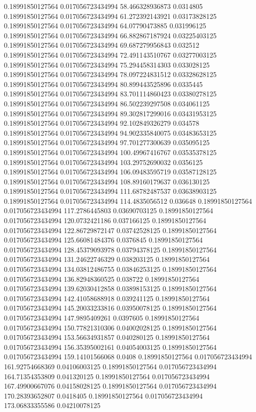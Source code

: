 0.18991850127564 0.017056723434994 58.466328936873 0.0314805
0.18991850127564 0.017056723434994 61.272392143921 0.03173828125
0.18991850127564 0.017056723434994 64.07790473885 0.031996125
0.18991850127564 0.017056723434994 66.882867187924 0.03225403125
0.18991850127564 0.017056723434994 69.687279956843 0.032512
0.18991850127564 0.017056723434994 72.491143510767 0.03277003125
0.18991850127564 0.017056723434994 75.294458314303 0.033028125
0.18991850127564 0.017056723434994 78.097224831512 0.03328628125
0.18991850127564 0.017056723434994 80.899443525896 0.0335445
0.18991850127564 0.017056723434994 83.701114860423 0.03380278125
0.18991850127564 0.017056723434994 86.502239297508 0.034061125
0.18991850127564 0.017056723434994 89.302817299016 0.03431953125
0.18991850127564 0.017056723434994 92.102849326279 0.034578
0.18991850127564 0.017056723434994 94.902335840075 0.03483653125
0.18991850127564 0.017056723434994 97.701277300639 0.035095125
0.18991850127564 0.017056723434994 100.49967416767 0.03535378125
0.18991850127564 0.017056723434994 103.29752690032 0.0356125
0.18991850127564 0.017056723434994 106.09483595719 0.03587128125
0.18991850127564 0.017056723434994 108.89160179637 0.036130125
0.18991850127564 0.017056723434994 111.68782487537 0.03638903125
0.18991850127564 0.017056723434994 114.4835056512 0.036648
0.18991850127564 0.017056723434994 117.2786445803 0.03690703125
0.18991850127564 0.017056723434994 120.0732421186 0.037166125
0.18991850127564 0.017056723434994 122.86729872147 0.03742528125
0.18991850127564 0.017056723434994 125.66081484376 0.0376845
0.18991850127564 0.017056723434994 128.45379093978 0.03794378125
0.18991850127564 0.017056723434994 131.24622746329 0.038203125
0.18991850127564 0.017056723434994 134.03812486755 0.03846253125
0.18991850127564 0.017056723434994 136.82948360525 0.038722
0.18991850127564 0.017056723434994 139.62030412858 0.03898153125
0.18991850127564 0.017056723434994 142.41058688918 0.039241125
0.18991850127564 0.017056723434994 145.20033233816 0.03950078125
0.18991850127564 0.017056723434994 147.9895409261 0.0397605
0.18991850127564 0.017056723434994 150.77821310306 0.04002028125
0.18991850127564 0.017056723434994 153.56634931857 0.040280125
0.18991850127564 0.017056723434994 156.35395002161 0.04054003125
0.18991850127564 0.017056723434994 159.14101566068 0.0408
0.18991850127564 0.017056723434994 161.92754668369 0.04106003125
0.18991850127564 0.017056723434994 164.71354353809 0.041320125
0.18991850127564 0.017056723434994 167.49900667076 0.04158028125
0.18991850127564 0.017056723434994 170.28393652807 0.0418405
0.18991850127564 0.017056723434994 173.06833355586 0.04210078125
